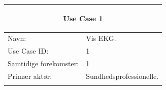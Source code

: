 \begin{table}[H] %
    \begin{tabularx}{\textwidth}{l X}
    \toprule 
    \multicolumn{2}{c}{\begin{large}\textbf{Use Case 1}\end{large}}
 \\ \midrule \addlinespace[1mm]                                                                                                                                                        
     Navn:                  &  Vis EKG. \\ \addlinespace[1mm]                                                                                                                                                       
     Use Case ID:           & 1                                                                                                                                                                                                                                                                                                                                                                                                                                                                                                                                                                                                                         \\ \addlinespace[1mm]                                                                                                                                                       
     Samtidige forekomster: & 1                                                                                                                                                                                                                                                                                                                                                                                                                                                                                                                                                                                                                         \\ \addlinespace[1mm]                                                                                                                                                       
     Primær aktør:          &	Sundhedsprofessionelle.                                                                                                                                                                                                                                                                                                                                                                                                                                                                                                                                                                                                                 \\ \addlinespace[1mm] 

\end{tabularx}
\end{table}
